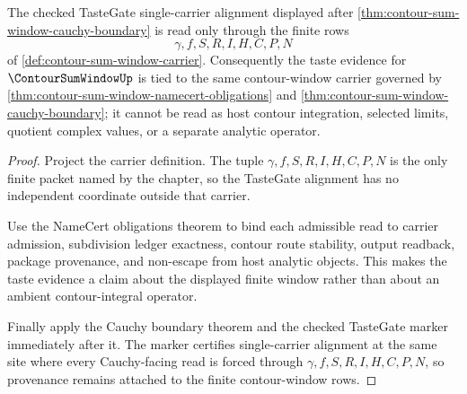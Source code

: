 \begin{theorem}
\label{thm:contour-sum-window-tastegate-provenance}
The checked TasteGate single-carrier alignment displayed after \autoref{thm:contour-sum-window-cauchy-boundary} is read only through the finite rows
$$
\gamma,f,S,R,I,H,C,P,N
$$
of \autoref{def:contour-sum-window-carrier}. Consequently the taste evidence for $\ContourSumWindowUp$ is tied to the same contour-window carrier governed by \autoref{thm:contour-sum-window-namecert-obligations} and \autoref{thm:contour-sum-window-cauchy-boundary}; it cannot be read as host contour integration, selected limits, quotient complex values, or a separate analytic operator.
\end{theorem}
\begin{proof}
Project the carrier definition. The tuple $\gamma,f,S,R,I,H,C,P,N$ is the only finite packet named by the chapter, so the TasteGate alignment has no independent coordinate outside that carrier.

Use the NameCert obligations theorem to bind each admissible read to carrier admission, subdivision ledger exactness, contour route stability, output readback, package provenance, and non-escape from host analytic objects. This makes the taste evidence a claim about the displayed finite window rather than about an ambient contour-integral operator.

Finally apply the Cauchy boundary theorem and the checked TasteGate marker immediately after it. The marker certifies single-carrier alignment at the same site where every Cauchy-facing read is forced through $\gamma,f,S,R,I,H,C,P,N$, so provenance remains attached to the finite contour-window rows.
\end{proof}

